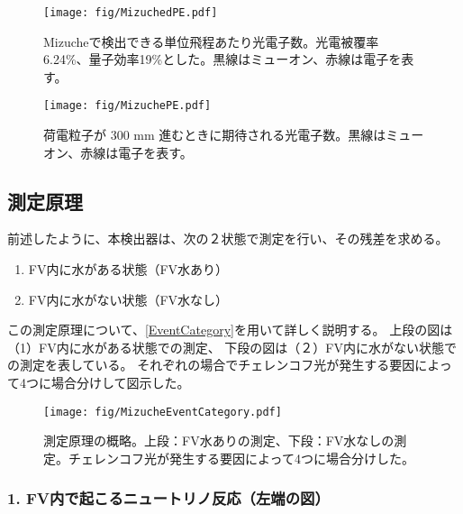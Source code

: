 \begin{figure}[htbp]
  \begin{minipage}{0.47\textwidth}
    \centering
    \texttt{[image: fig/MizuchedPE.pdf]}
    \caption[Mizucheで検出できる単位飛程あたりの光電子数]{Mizucheで検出できる単位飛程あたり光電子数。光電被覆率 6.24\%、量子効率19\%とした。黒線はミューオン、赤線は電子を表す。}
    \label{MizuchedPE}
  \end{minipage}
  \hfill
  \begin{minipage}{0.47\textwidth}
    \centering
    \texttt{[image: fig/MizuchePE.pdf]}
    \caption[荷電粒子が 300 mm 進むときに期待される光電子数数]{荷電粒子が 300 mm 進むときに期待される光電子数。黒線はミューオン、赤線は電子を表す。}
    \label{MizuchePE}
  \end{minipage}
\end{figure}

\newpage

\subsection{測定原理}

前述したように、本検出器は、次の２状態で測定を行い、その残差を求める。

\begin{enumerate}
\item FV内に水がある状態（FV水あり）
\item FV内に水がない状態（FV水なし）
\end{enumerate}

この測定原理について、\autoref{EventCategory}を用いて詳しく説明する。
上段の図は（1）FV内に水がある状態での測定、
下段の図は（２）FV内に水がない状態での測定を表している。
それぞれの場合でチェレンコフ光が発生する要因によって4つに場合分けして図示した。

\begin{figure}[htbp]
\centering
\texttt{[image: fig/MizucheEventCategory.pdf]}
\caption[測定原理の概略]{測定原理の概略。上段：FV水ありの測定、下段：FV水なしの測定。チェレンコフ光が発生する要因によって4つに場合分けした。}
\label{EventCategory}
\end{figure}

\subsubsection{1. FV内で起こるニュートリノ反応（左端の図）}

